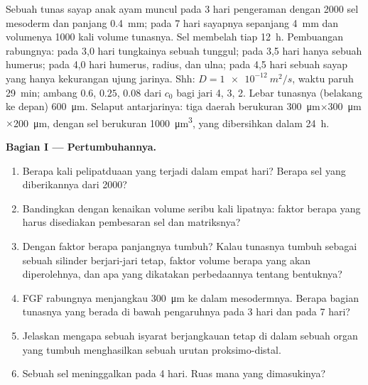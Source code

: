 \begin{problem}
\label{pb:b2:limb-organogenesis:1}
Sebuah tunas sayap anak ayam muncul pada 3 hari pengeraman dengan
\num{2000} sel mesoderm dan panjang \qty{0.4}{mm}; pada 7 hari sayapnya
sepanjang \qty{4}{mm} dan volumenya \num{1000} kali volume tunasnya.
Sel  membelah tiap \qty{12}{h}. Pembuangan rabungnya:
pada 3,0 hari tungkainya sebuah tunggul; pada 3,5 hari hanya sebuah
humerus; pada 4,0 hari humerus, radius, dan ulna; pada 4,5 hari sebuah
sayap yang hanya kekurangan ujung jarinya. Shh: $D = \qty{1e-12}{m^2/s}$, waktu paruh \qty{29}{min}; ambang $0.6$, $0.25$,
$0.08$ dari $c_0$ bagi jari 4, 3, 2. Lebar tunasnya (belakang ke depan)
\qty{600}{\micro m}. Selaput antarjarinya: tiga daerah berukuran
\qty{300}{\micro m}$\times$\qty{300}{\micro m}$\times$\qty{200}{\micro m}, dengan sel
berukuran \qty{1000}{\micro m^3}, yang dibersihkan dalam \qty{24}{h}.

\medskip
\noindent\textbf{Bagian I --- Pertumbuhannya.}
\begin{enumerate}
  \item Berapa kali pelipatduaan yang terjadi dalam empat hari? Berapa
        sel yang diberikannya dari \num{2000}?
  \item Bandingkan dengan kenaikan volume seribu kali lipatnya: faktor
        berapa yang harus disediakan pembesaran sel dan matriksnya?
  \item Dengan faktor berapa panjangnya tumbuh? Kalau tunasnya tumbuh
        sebagai sebuah silinder berjari-jari tetap, faktor volume
        berapa yang akan diperolehnya, dan apa yang dikatakan
        perbedaannya tentang bentuknya?
  \item FGF rabungnya menjangkau \qty{300}{\micro m} ke dalam
        mesodermnya. Berapa bagian tunasnya yang berada di bawah
        pengaruhnya pada 3 hari dan pada 7 hari?
  \item Jelaskan mengapa sebuah isyarat berjangkauan tetap di dalam
        sebuah organ yang tumbuh menghasilkan sebuah urutan
        proksimo-distal.
  \item Sebuah sel meninggalkan  pada 4 hari. Ruas mana
        yang dimasukinya?
\end{enumerate}


\end{problem}
